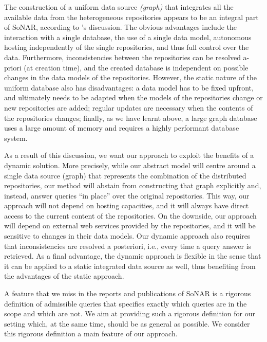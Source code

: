 The construction of a uniform data source \emph{(graph)} that integrates all the available data
from the heterogeneous repositories appears to be an integral part of \gls{SoNAR},
according to \citeauthor*{Menzel2020}'s \autocite*{Menzel2020} discussion.
The obvious advantages include the interaction with a single database,
the use of a single data model, autonomous hosting
independently of the single repositories, and thus full control over the data.
Furthermore, inconsistencies
between the repositories can be resolved a-priori (at creation time),
and the created database is independent on possible changes in the data models of the repositories.
However, the static nature of the uniform database also has disadvantages:
a data model has to be fixed upfront, and ultimately needs to be adapted when
the models of the repositories change or new repositories are added;
regular updates are necessary when the contents of the repositories changes;
finally, as we have learnt above,
a large graph database uses a large amount of memory and requires a highly performant
database system.

As a result of this discussion,
we want our approach to exploit the benefits of a dynamic solution.
More precisely, while our abstract model will centre around a single data source (graph)
that represents the combination of the distributed repositories,
our method will abstain from constructing that graph explicitly and, instead,
answer queries \enquote{in place} over the original repositories.
This way, our approach will not depend on hosting capacities,
and it will always have direct access to the current content of the repositories.
On the downside, our approach will depend on external web services provided by the repositories,
and it will be sensitive to changes in their data models.
Our dynamic approach also requires that inconsistencies are resolved
a posteriori, i.e., every time a query answer is retrieved.
As a final advantage, the dynamic approach is flexible
in the sense that it can be applied to a static integrated data source as well,
thus benefiting from the advantages of the static approach.

A feature that we miss in the reports and publications of \gls{SoNAR} is a rigorous definition of admissible queries
that specifies exactly which queries are in the scope and which are not.
We aim at providing such a rigorous definition for our setting
which, at the same time, should be as general as possible. We consider this rigorous definition
a main feature of our approach.

